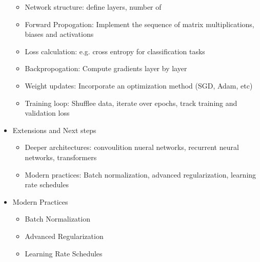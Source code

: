 \documentclass[9pt]{extarticle}
\theoremstyle{plain}
\theoremstyle{definition}
\theoremstyle{remark}
\begin{document}
\begin{itemize}
\begin{itemize}
              \item Network structure: define layers, number of
              \item Forward Propogation: Implement the sequence of matrix multiplications, biases and activations
              \item Loss calculation: e.g. cross entropy for classification tasks
              \item Backpropogation: Compute gradients layer by layer
              \item Weight updates: Incorporate an optimization method (SGD, Adam, etc)
              \item Training loop: Shufflee data, iterate over epochs, track training and validation loss
          \end{itemize}
    \item Extensions and Next steps
          \begin{itemize}
              \item Deeper architectures: convoulition nueral networks, recurrent neural networks, transformers
              \item Modern practices: Batch normalization, advanced regularization, learning rate schedules
          \end{itemize}
    \item Modern Practices
          \begin{itemize}
              \item Batch Normalization
              \item Advanced Regularization
              \item Learning Rate Schedules
          \end{itemize}
\end{itemize}


\pagebreak

\end{document}

